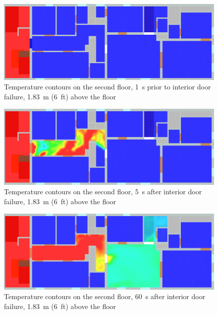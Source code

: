\begin{figure}[!ht]
\centering
\includegraphics[width=.68\textwidth]{../Figures/west_50th_baseline_top_159_6ft}
 

\caption[Temperature contours on the second floor, 1~s prior to interior door failure]
{Temperature contours on the second floor, 1~s prior to interior door failure, 1.83~m (6~ft) above the floor}
\label{fig:temp_top_159}
\end{figure}

\begin{figure}[!ht]
\centering
\includegraphics[width=.68\textwidth]{../Figures/west_50th_baseline_top_165_6ft}
 

\caption[Temperature contours on the second floor, 5~s after interior door failure]
{Temperature contours on the second floor, 5~s after interior door failure, 1.83~m (6~ft) above the floor}
\label{fig:temp_top_165}
\end{figure}

\begin{figure}[!ht]
\centering
\includegraphics[width=.68\textwidth]{../Figures/west_50th_baseline_top_220_6ft}
 

\caption[Temperature contours on the second floor, 60~s after interior door failure]
{Temperature contours on the second floor, 60~s after interior door failure, 1.83~m (6~ft) above the floor}
\label{fig:temp_top_220}
\end{figure}

